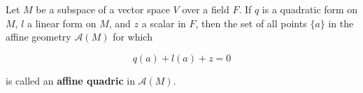 Let $M$ be a subspace of a vector space $V$ over a field $F$. If $q$ is a quadratic form on $M$, $l$ a linear form on $M$, and $z$ a scalar in $F$, then the set of all points $\{a\}$ in the affine geometry $\mathcal{A}(M)$ for which

$$q(a) + l(a) + z = 0$$

is called an \textbf{affine quadric} in $\mathcal{A}(M)$.
